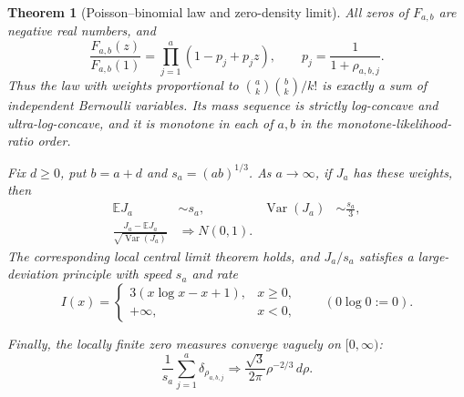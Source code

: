 \documentclass[11pt]{article}
\newtheorem{theorem}{Theorem}[section]
\theoremstyle{definition}
\theoremstyle{remark}
\newcommand{\Var}{\operatorname{Var}}
\begin{document}
\begin{theorem}[Poisson--binomial law and zero-density limit]
\label{thm:poisson-binomial}
All zeros of \(F_{a,b}\) are negative real numbers, and
\begin{equation}\label{eq:Poisson-binomial-factor}
 \frac{F_{a,b}(z)}{F_{a,b}(1)}
 =\prod_{j=1}^a(1-p_j+p_jz),
 \qquad p_j=\frac1{1+\rho_{a,b,j}}.
\end{equation}
Thus the law with weights proportional to
\(\binom ak\binom bk/k!\) is exactly a sum of independent Bernoulli
variables.  Its mass sequence is strictly log-concave and ultra-log-concave,
and it is monotone in each of \(a,b\) in the monotone-likelihood-ratio order.

Fix \(d\ge0\), put \(b=a+d\) and \(s_a=(ab)^{1/3}\).  As \(a\to\infty\),
if \(J_a\) has these weights, then
\begin{align}
 \mathbb EJ_a&\sim s_a,&
 \Var(J_a)&\sim\frac{s_a}{3},
 \label{eq:Ja-mean-var}\\
 \frac{J_a-\mathbb EJ_a}{\sqrt{\Var(J_a)}}&\Longrightarrow N(0,1).
 \label{eq:Ja-CLT}
\end{align}
The corresponding local central limit theorem holds, and \(J_a/s_a\)
satisfies a large-deviation principle with speed \(s_a\) and rate
\begin{equation}\label{eq:Ja-rate}
 I(x)=
 \begin{cases}
 3(x\log x-x+1),&x\ge0,\\
 +\infty,&x<0,
 \end{cases}
 \qquad(0\log0:=0).
\end{equation}

Finally, the locally finite zero measures converge vaguely on
\([0,\infty)\):
\begin{equation}\label{eq:zero-density-limit}
 \boxed{\displaystyle
 \frac1{s_a}\sum_{j=1}^a\delta_{\rho_{a,b,j}}
 \Longrightarrow
 \frac{\sqrt3}{2\pi}\rho^{-2/3}\,d\rho.}
\end{equation}
\end{theorem}
\end{document}
